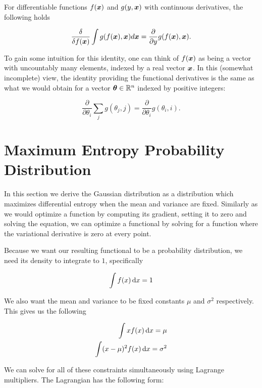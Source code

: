 For differentiable functions $f({\bm{x}})$ and $g(y, {\bm{x}})$ with continuous
derivatives, the following holds

\begin{equation}
  \frac{\delta}{\delta f({\bm{x}})} \int g(f({\bm{x}}), {\bm{x}}) d {\bm{x}} = \frac{\partial}{\partial y} g(f({\bm{x}}), {\bm{x}}).
\end{equation}

 To gain some intuition for this identity,
one can think of $f({\bm{x}})$ as being a vector with uncountably many elements,
indexed by a real vector ${\bm{x}}$. In this (somewhat incomplete) view, the
identity providing the functional derivatives is the same as what we would
obtain for a vector ${\bm{\theta}} \in {\mathbb{R}}^n$ indexed by positive integers:

\begin{equation}
  \frac{\partial}{\partial \theta_i} \sum_j g(\theta_j, j) = \frac{\partial}{\partial \theta_i} g(\theta_i, i).
\end{equation}

\section{Maximum Entropy Probability Distribution}

In this section we derive the Gaussian distribution as a distribution which
maximizes differential entropy when the mean and variance are fixed. Similarly
as we would optimize a function by computing its gradient, setting it to zero
and solving the equation, we can optimize a functional by solving for a
function where the variational derivative is zero at every point.

Because we want our resulting functional to be a probability distribution, we
need its density to integrate to $1$, specifically

\begin{equation}
  \int f(x) \mathop{}\!\mathrm{d} x = 1
\end{equation}

We also want the mean and variance to be fixed constants $\mu$ and $\sigma^2$
respectively. This gives us the following

\begin{align}
  \int x f(x) \mathop{}\!\mathrm{d} x = \mu \\
  \int (x - \mu) ^2 f(x) \mathop{}\!\mathrm{d} x = \sigma^2
\end{align}

We can solve for all of these constraints simultaneously using Lagrange
multipliers. The Lagrangian has the following form:


